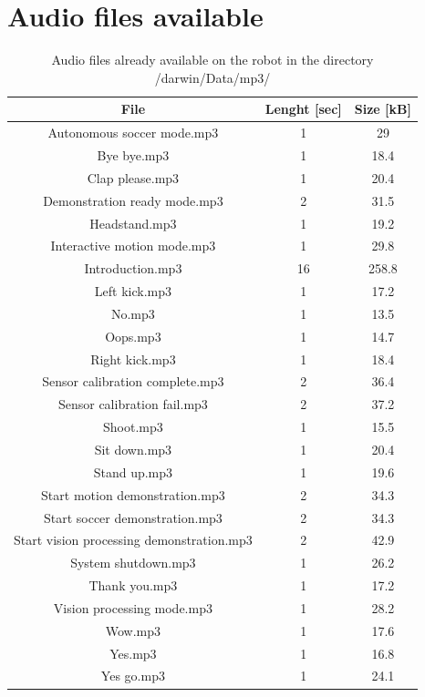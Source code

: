 \documentclass[a4paper, 12pt]{article}  		%
\begin{document}

\section{Audio files available} \label{sec:audioFile}

\begin{table}[H]
\begin{center}
\begin{tabular}{ | c | c | c |  }

\hline
File & Lenght [sec] & Size [kB] \\ 
\hline
\hline
Autonomous soccer mode.mp3 & 1 & 29 \\
\hline
Bye bye.mp3 & 1 & 18.4 \\
\hline
Clap please.mp3 & 1 & 20.4 \\
\hline
Demonstration ready mode.mp3 & 2 & 31.5 \\
\hline
Headstand.mp3 & 1 & 19.2 \\
\hline
Interactive motion mode.mp3 & 1 & 29.8 \\
\hline
Introduction.mp3 & 16 & 258.8 \\
\hline
Left kick.mp3 & 1 & 17.2 \\
\hline
No.mp3 & 1 & 13.5 \\
\hline
Oops.mp3 & 1 & 14.7 \\
\hline
Right kick.mp3 & 1 & 18.4 \\
\hline
Sensor calibration complete.mp3 & 2 & 36.4 \\
\hline
Sensor calibration fail.mp3 & 2 & 37.2 \\
\hline
Shoot.mp3 & 1 & 15.5 \\
\hline
Sit down.mp3 & 1 & 20.4 \\
\hline
Stand up.mp3 & 1 & 19.6 \\
\hline
Start motion demonstration.mp3 & 2 & 34.3 \\
\hline
Start soccer demonstration.mp3 & 2 & 34.3 \\
\hline
Start vision processing demonstration.mp3 & 2 & 42.9 \\
\hline
System shutdown.mp3 & 1 & 26.2 \\
\hline
Thank you.mp3 & 1 & 17.2 \\
\hline
Vision processing mode.mp3 & 1 & 28.2 \\
\hline
Wow.mp3 & 1 & 17.6 \\
\hline
Yes.mp3 & 1 & 16.8 \\
\hline
Yes go.mp3 & 1 & 24.1 \\
\hline
\end{tabular}
\caption{Audio files already available on the robot in the directory /darwin/Data/mp3/}
\label{tab::audioFile}
\end{center}
\end{table}

\end{document}
